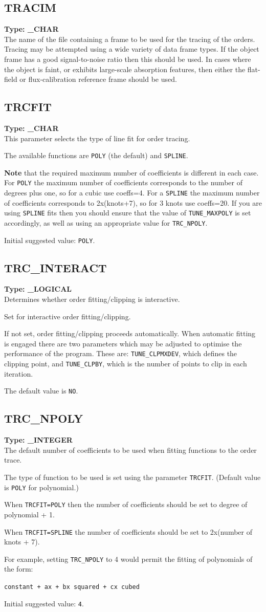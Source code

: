 \documentclass[11pt,twoside]{article}
\makeatletter
\newcommand{\htmlref}[2]{#1}
\newcommand{\xlabel}[1]{}
\newcommand{\sunspec}[2]{#1}
\renewcommand{\sunspec}[2]{#2}
\newcommand{\indexcmdname}[1]{\index{#1@\protect\cmdname{#1}}}
\renewcommand{\indexcmdname}[1]{}
\newcommand{\cmdname}{\begingroup \catcode`\_=12 \realcmdname}
\newcommand{\realcmdname}[1]{\endgroup\texttt{#1}}
\newcommand{\echparameter}[4]
{
\item [#1 = #3] \mbox{}\label{par_#2}\indexcmdname{#2}
\\
#4
}
\renewcommand{\echparameter}[4]
{
  \subsection{\xlabel{par_#2}\label{par_#2}{\bf #1}}
  {\bf Type: #3}\\
#4
}
\makeatother
\begin{document}
\echparameter{TRACIM}{TRACIM}{
 \_CHAR
}{
 The name of the file containing a frame to be used for the tracing of
 the orders.  Tracing may be attempted using a wide variety of data
 frame types.  If the object frame has a good signal-to-noise ratio
 then this should be used.  In cases where the object is faint, or
 exhibits large-scale absorption features, then either the flat-field
 or flux-calibration reference frame should be used.
}

\echparameter{TRCFIT}{TRCFIT}{
 \_CHAR
}{
 This parameter selects the type of line fit for order tracing.

 The available functions are \texttt{POLY} (the default) and \texttt{SPLINE}.

 {\bf Note} that the required maximum number of coefficients is different
 in each case.  For \texttt{POLY} the maximum number of coefficients corresponds
 to the number of degrees plus one, so for a cubic use coeffs=4.
 For a \texttt{SPLINE} the maximum number of coefficients corresponds to
 \sunspec{(knots+7)$\times$2}{2x(knots+7)}, so for 3 knots use coeffs=20.
 If you are using
 \texttt{SPLINE} fits then you should ensure that the value of
 \htmlref{{\tt TUNE\_MAXPOLY}}{par_TUNE_MAXPOLY} is set
 accordingly, as well as using an appropriate value for
 \htmlref{{\tt TRC\_NPOLY}}{par_TRC_NPOLY}.

 Initial suggested value: \texttt{POLY}.
}

\echparameter{TRC\_INTERACT}{TRC_INTERACT}{
 \_LOGICAL
}{
 Determines whether order fitting/clipping is interactive.

 Set for interactive order fitting/clipping.

 If not set, order fitting/clipping proceeds automatically.  When
 automatic fitting is engaged there are two parameters which
 may be adjusted to optimise the performance of the program.
 These are: \htmlref{{\tt TUNE\_CLPMXDEV}}{par_TUNE_CLPMXDEV},
 which defines the clipping point, and
 \htmlref{{\tt TUNE\_CLPBY}}{par_TUNE_CLPBY}, which is the number of
 points to clip in each iteration.

 The default value is \texttt{NO}.
}

\echparameter{TRC\_NPOLY}{TRC_NPOLY}{
 \_INTEGER
}{
 The default number of coefficients to be used when fitting functions
 to the order trace.

 The type of function to be used is set using the parameter
 \htmlref{\texttt{TRCFIT}}{par_TRCFIT}.
 (Default value is \texttt{POLY} for polynomial.)

 When \texttt{TRCFIT=POLY} then the number of
 coefficients should be set to degree of polynomial + 1.

 When \texttt{TRCFIT=SPLINE} the number of coefficients should be set to
 \sunspec{(number of knots + 7)$\times$2}{2x(number of knots + 7)}.

 For example, setting {\tt TRC\_NPOLY} to 4 would permit the fitting of
 polynomials of the form:

\sunspec{
   ${\rm constant} + ax + bx^{2} + cx^{3}$.
}{
\texttt{constant + ax + bx squared + cx cubed}
}
 Initial suggested value: \texttt{4}.
}
\end{document}
